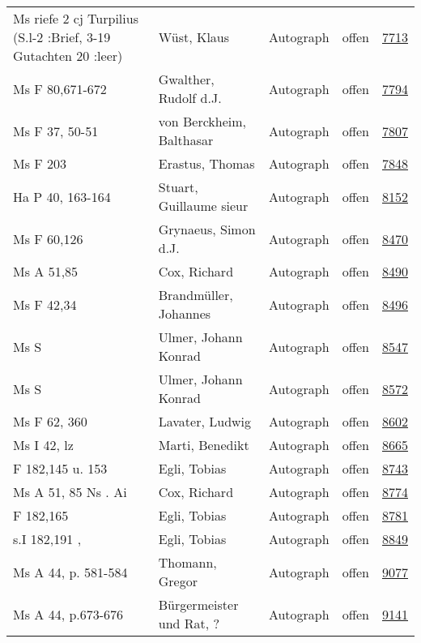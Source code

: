 \documentclass[10pt,a4paper,landscape]{report}
\begin{document}
\begin{longtable}{p{16cm}p{4cm}llr}
Ms riefe 2 cj Turpilius (S.l-2 :Brief, 3-19 Gutachten 20 :leer)	&	Wüst, Klaus	&	Autograph	&	offen	&	\href{http://130.60.24.72/assignment/7713}{7713}\\
Ms F 80,671-672	&	Gwalther, Rudolf d.J.	&	Autograph	&	offen	&	\href{http://130.60.24.72/assignment/7794}{7794}\\
Ms F 37, 50-51	&	von Berckheim, Balthasar	&	Autograph	&	offen	&	\href{http://130.60.24.72/assignment/7807}{7807}\\
Ms F 203	&	Erastus, Thomas	&	Autograph	&	offen	&	\href{http://130.60.24.72/assignment/7848}{7848}\\
Ha P 40, 163-164	&	Stuart, Guillaume sieur	&	Autograph	&	offen	&	\href{http://130.60.24.72/assignment/8152}{8152}\\
Ms F 60,126	&	Grynaeus, Simon d.J.	&	Autograph	&	offen	&	\href{http://130.60.24.72/assignment/8470}{8470}\\
Ms A 51,85	&	Cox, Richard	&	Autograph	&	offen	&	\href{http://130.60.24.72/assignment/8490}{8490}\\
Ms F 42,34	&	Brandmüller, Johannes	&	Autograph	&	offen	&	\href{http://130.60.24.72/assignment/8496}{8496}\\
Ms S	&	Ulmer, Johann Konrad	&	Autograph	&	offen	&	\href{http://130.60.24.72/assignment/8547}{8547}\\
Ms S	&	Ulmer, Johann Konrad	&	Autograph	&	offen	&	\href{http://130.60.24.72/assignment/8572}{8572}\\
Ms F 62, 360	&	Lavater, Ludwig	&	Autograph	&	offen	&	\href{http://130.60.24.72/assignment/8602}{8602}\\
Ms I 42, lz	&	Marti, Benedikt	&	Autograph	&	offen	&	\href{http://130.60.24.72/assignment/8665}{8665}\\
F 182,145 u. 153	&	Egli, Tobias	&	Autograph	&	offen	&	\href{http://130.60.24.72/assignment/8743}{8743}\\
Ms A 51, 85 Ns . Ai	&	Cox, Richard	&	Autograph	&	offen	&	\href{http://130.60.24.72/assignment/8774}{8774}\\
F 182,165	&	Egli, Tobias	&	Autograph	&	offen	&	\href{http://130.60.24.72/assignment/8781}{8781}\\
s.I 182,191 ,	&	Egli, Tobias	&	Autograph	&	offen	&	\href{http://130.60.24.72/assignment/8849}{8849}\\
Ms A 44, p. 581-584	&	Thomann, Gregor	&	Autograph	&	offen	&	\href{http://130.60.24.72/assignment/9077}{9077}\\
Ms A 44, p.673-676	&	Bürgermeister und Rat, ?	&	Autograph	&	offen	&	\href{http://130.60.24.72/assignment/9141}{9141}\\

\end{longtable}
\end{document}
